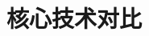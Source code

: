\documentclass{article}
\begin{document}
\section{核心技术对比}\label{ux4e8cux6838ux5fc3ux6280ux672fux5bf9ux6bd4}

\end{document}
